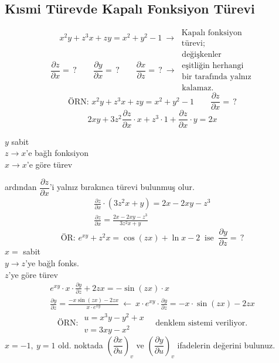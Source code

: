 \documentclass[11pt,a4paper]{article}
\begin{document}
\subsection{Kısmi Türevde Kapalı Fonksiyon Türevi}
\[ x^2y+z^3x+zy=x^2+y^2-1\ \to\ \begin{array}{l}\text{Kapalı fonksiyon}\\ \text{türevi;}\end{array} \]
\[ \frac{\partial z}{\partial x}=\,?\qquad\frac{\partial y}{\partial x}=\,?\qquad\frac{\partial x}{\partial z}=\,?\ \to\ \begin{array}{l}\text{değişkenler}\\ \text{eşitliğin herhangi}\\ \text{bir tarafında yalnız}\\ \text{kalamaz.}\end{array} \]
\[ \text{ÖRN: }x^2y+z^3x+zy=x^2+y^2-1\qquad\frac{\partial z}{\partial x}=\,? \]
\[ 2xy+3z^2\frac{\partial z}{\partial x}\cdot x+z^3\cdot1+\frac{\partial z}{\partial x}\cdot y=2x \]
\begin{center}
$y$ sabit\\ $z\to x$'e bağlı fonksiyon\\ $x\to x$'e göre türev
\end{center}
ardından $\dfrac{\partial z}{\partial x}$'i yalnız bırakınca türevi bulunmuş olur.
\begin{gather*}
\frac{\partial z}{\partial x}\cdot(3z^2x+y)=2x-2xy-z^3\\
\frac{\partial z}{\partial x}=\frac{2x-2xy-z^3}{3z^2x+y}
\end{gather*}
\[ \text{ÖR: }e^{xy}+z^2x=\cos(zx)+\ln x-2\ \text{ ise }\ \frac{\partial y}{\partial z}=\,? \]
$x=$ sabit\\ $y\to z$'ye bağlı fonks.\\ $z$'ye göre türev
\begin{gather*}
e^{xy}\cdot x\cdot\frac{\partial y}{\partial z}+2zx=-\sin(zx)\cdot x\\
\frac{\partial y}{\partial z}=\frac{-x\sin(zx)-2zx}{x\cdot e^{xy}}\ \leftarrow\ x\cdot e^{xy}\cdot\frac{\partial y}{\partial z}=-x\cdot\sin(zx)-2zx
\end{gather*}
\[ \text{ÖRN: }\begin{array}{l}u=x^3y-y^2+x\\ v=3xy-x^2\end{array}\quad\text{denklem sistemi veriliyor.} \]
$x=-1,\ y=1$ old. noktada $\left(\dfrac{\partial x}{\partial u}\right)_v$ ve $\left(\dfrac{\partial y}{\partial u}\right)_v$ ifadelerin değerini bulunuz.
\end{document}
